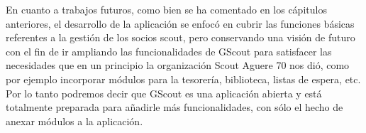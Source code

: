 En cuanto a trabajos futuros, como bien se ha comentado en los cápitulos anteriores, el desarrollo de la aplicación se enfocó en cubrir las funciones básicas
referentes a la gestión de los socios scout, pero conservando una visión de futuro con el fin de ir ampliando las funcionalidades de GScout
para satisfacer las necesidades que en un principio la organización Scout Aguere 70 nos dió, como por ejemplo incorporar módulos para la tesorería, biblioteca, listas de espera, etc.\\

Por lo tanto podremos decir que GScout es una aplicación abierta y está totalmente preparada para añadirle más funcionalidades, con sólo el hecho de anexar
módulos a la aplicación.
